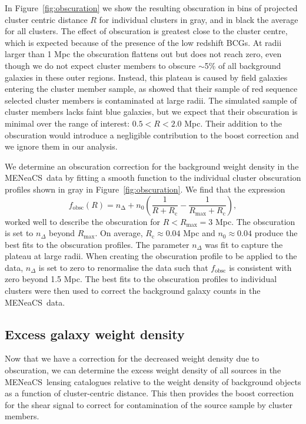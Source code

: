 \documentclass[useAMS,usenatbib]{mnras}
\newcommand{\mn}{MENeaCS}
\begin{document}
In Figure~\ref{fig:obscuration} we show the resulting obscuration in bins of projected cluster centric distance  $R$ for individual clusters in gray, and in black the average for all clusters. The effect of obscuration is greatest close to the cluster centre, which is expected because of the presence of the low redshift BCGs. At radii larger than 1 Mpc the obscuration flattens out but does not reach zero, even though we do not expect cluster members to obscure $\sim$5\% of all background galaxies in these outer regions. Instead, this plateau is caused by field galaxies entering the cluster member sample, as \citet{sifon15} showed that their sample of red sequence selected cluster members is contaminated at large radii. The simulated sample of cluster members lacks faint blue galaxies, but we expect that their obscuration is minimal over the range of interest: $0.5<R<2.0$ Mpc. Their addition to the obscuration would introduce a negligible contribution to the boost correction and we ignore them in our analysis.

We determine an obscuration correction for the background weight density in the \mn \ data by fitting a smooth function to the individual cluster obscuration profiles shown in gray in Figure~\ref{fig:obscuration}. We find that the expression
\begin{equation}
 f_\mathrm{obsc}(R) = n_\mathrm{\Delta} + n_\mathrm{0} \left( \frac{1}{R+R_\mathrm{c}} -  \frac{1}{R_\mathrm{max}+R_\mathrm{c}}  \right), 
 \label{eq:obsc_fit}
\end{equation}
worked well to describe the obscuration for $R<R_\mathrm{max}=3$ Mpc. The obscuration is set to $n_\Delta$ beyond $R_\mathrm{max}$. On average, $R_\mathrm{c} \approx 0.04$ Mpc and $n_0 \approx 0.04$ produce the best fits to the obscuration profiles. The parameter $n_\Delta$ was fit to capture the plateau at large radii. When creating the obscuration profile to be applied to the data, $n_\Delta$ is set to zero to renormalise the data such that $f_\mathrm{obsc}$ is consistent with zero beyond 1.5 Mpc. The best fits to the obscuration profiles to individual clusters were then used to correct the background galaxy counts in the \mn \ data. 



\subsection{Excess galaxy weight density}
Now that we have a correction for the decreased weight density due to obscuration, we can determine the excess weight density of all sources in the \mn \ lensing catalogues relative to the weight density of background objects as a function of cluster-centric distance. This then provides the boost correction for the shear signal to correct for contamination of the source sample by cluster members.
\end{document}
